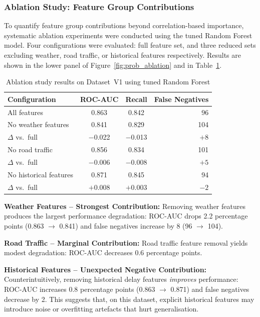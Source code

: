 \documentclass{report}
\begin{document}
\subsubsection*{Ablation Study: Feature Group Contributions}

To quantify feature group contributions beyond correlation-based importance,
systematic ablation experiments were conducted using the tuned Random Forest
model.  Four configurations were evaluated: full feature set, and three
reduced sets excluding weather, road traffic, or historical features
respectively.  Results are shown in the lower panel of
Figure~\ref{fig:prob_ablation} and in Table~\ref{tab:v1ablation}.

\begin{table}[H]
\centering
\caption{Ablation study results on Dataset~V1 using tuned Random Forest}
\label{tab:v1ablation}
\begin{tabular}{lccr}
\toprule
\textbf{Configuration} & \textbf{ROC-AUC} & \textbf{Recall} &
  \textbf{False Negatives} \\
\midrule
All features            & 0.863 & 0.842 & 96  \\
No weather features     & 0.841 & 0.829 & 104 \\
$\Delta$ vs.\ full      & $-$0.022 & $-$0.013 & $+8$  \\
No road traffic         & 0.856 & 0.834 & 101 \\
$\Delta$ vs.\ full      & $-$0.006 & $-$0.008 & $+5$  \\
No historical features  & 0.871 & 0.845 & 94  \\
$\Delta$ vs.\ full      & $+$0.008 & $+$0.003 & $-2$  \\
\bottomrule
\end{tabular}
\end{table}

\textbf{Weather Features -- Strongest Contribution:} Removing weather
features produces the largest performance degradation: ROC-AUC drops 2.2
percentage points (0.863 $\to$ 0.841) and false negatives increase by 8
(96 $\to$ 104).

\textbf{Road Traffic -- Marginal Contribution:} Road traffic feature removal
yields modest degradation: ROC-AUC decreases 0.6 percentage points.

\textbf{Historical Features -- Unexpected Negative Contribution:}
Counterintuitively, removing historical delay features \emph{improves}
performance: ROC-AUC increases 0.8 percentage points (0.863 $\to$ 0.871)
and false negatives decrease by 2.  This suggests that, on this dataset,
explicit historical features may introduce noise or overfitting artefacts
that hurt generalisation.
\end{document}
